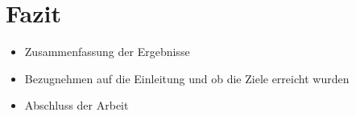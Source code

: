 \section{Fazit}

\begin{itemize}
	\item Zusammenfassung der Ergebnisse
	\item Bezugnehmen auf die Einleitung und ob die Ziele erreicht wurden
	\item Abschluss der Arbeit
\end{itemize}